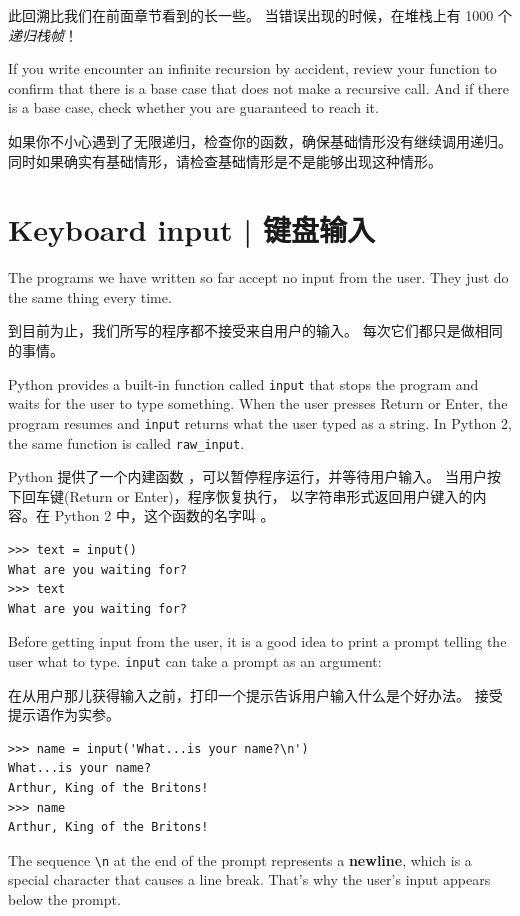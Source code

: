 {{{{此回溯比我们在前面章节看到的长一些。
当错误出现的时候，在堆栈上有 1000 个{\em 递归栈帧}！

If you write encounter an infinite recursion by accident, review
your function to confirm that there is a base case that does not
make a recursive call.  And if there is a base case, check whether
you are guaranteed to reach it.

如果你不小心遇到了无限递归，检查你的函数，确保基础情形没有继续调用递归。
同时如果确实有基础情形，请检查基础情形是不是能够出现这种情形。

\section{Keyboard input  |  键盘输入}

The programs we have written so far accept no input from the user.
They just do the same thing every time.

到目前为止，我们所写的程序都不接受来自用户的输入。
每次它们都只是做相同的事情。

Python provides a built-in function called {\tt input} that
stops the program and
waits for the user to type something.  When the user presses {\sf
  Return} or {\sf Enter}, the program resumes and \verb"input"
returns what the user typed as a string.  In Python 2, the same
function is called \verb"raw_input".

Python 提供了一个内建函数  ，可以暂停程序运行，并等待用户输入。
当用户按下回车键(Return or Enter)，程序恢复执行， 以字符串形式返回用户键入的内容。在 Python 2 中，这个函数的名字叫  。
    

\begin{lstlisting}
>>> text = input()
What are you waiting for?
>>> text
What are you waiting for?
\end{lstlisting}
%
Before getting input from the user, it is a good idea to print a
prompt telling the user what to type.  \verb"input" can take a
prompt as an argument:

在从用户那儿获得输入之前，打印一个提示告诉用户输入什么是个好办法。
 接受提示语作为实参。

\begin{lstlisting}
>>> name = input('What...is your name?\n')
What...is your name?
Arthur, King of the Britons!
>>> name
Arthur, King of the Britons!
\end{lstlisting}
%
The sequence \verb"\n" at the end of the prompt represents a {\bf
  newline}, which is a special character that causes a line break.
That's why the user's input appears below the prompt.  

}}}}
